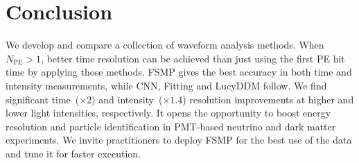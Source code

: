 \section{Conclusion}
\label{sec:conclusion}

We develop and compare a collection of waveform analysis methods.  When $N_\mathrm{PE} > 1$, better time resolution can be achieved than just using the first PE hit time by applying those methods.  FSMP gives the best accuracy in both time and intensity measurements, while CNN, Fitting and LucyDDM follow.  We find significant time~($\times 2$) and intensity~($\times 1.4$) resolution improvements at higher and lower light intensities, respectively.  It opens the opportunity to boost energy resolution and particle identification in PMT-based neutrino and dark matter experiments.  We invite practitioners to deploy FSMP for the best use of the data and tune it for faster execution.